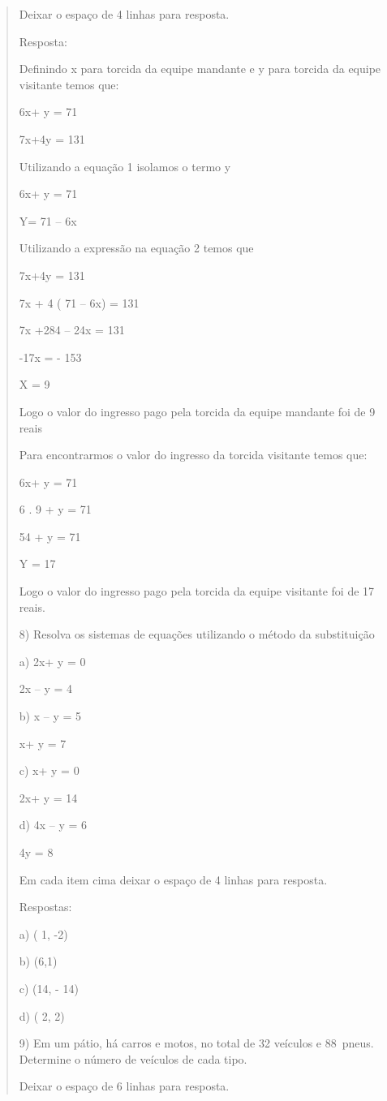 \begin{quote}
\begin{escolha}
Deixar o espaço de 4 linhas para resposta.

Resposta:

Definindo x para torcida da equipe mandante e y para torcida da equipe
visitante temos que:

6x+ y = 71

7x+4y = 131

Utilizando a equação 1 isolamos o termo y

6x+ y = 71

Y= 71 -- 6x

Utilizando a expressão na equação 2 temos que

7x+4y = 131

7x + 4 ( 71 -- 6x) = 131

7x +284 -- 24x = 131

-17x = - 153

X = 9

Logo o valor do ingresso pago pela torcida da equipe mandante foi de 9
reais

Para encontrarmos o valor do ingresso da torcida visitante temos que:

6x+ y = 71

6 . 9 + y = 71

54 + y = 71

Y = 17

Logo o valor do ingresso pago pela torcida da equipe visitante foi de 17
reais.

8) Resolva os sistemas de equações utilizando o método da substituição

a) 2x+ y = 0

2x -- y = 4

b) x -- y = 5

x+ y = 7

c) x+ y = 0

2x+ y = 14

d) 4x -- y = 6

4y = 8

Em cada item cima deixar o espaço de 4 linhas para resposta.

Respostas:

a) ( 1, -2)

b) (6,1)

c) (14, - 14)

d) ( 2, 2)

9) Em um pátio, há carros e motos, no total de 32 veículos e 88~pneus.
Determine o número de veículos de cada tipo.

Deixar o espaço de 6 linhas para resposta.


\end{escolha}
\end{quote}
